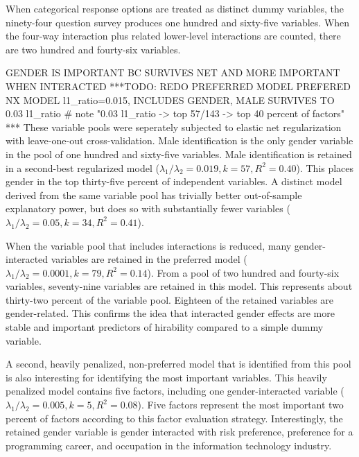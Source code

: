 \documentclass[review]{elsarticle}
\begin{document}
When categorical response options are treated as distinct dummy variables,
the ninety-four question survey produces one hundred and sixty-five variables.
When the four-way interaction plus related lower-level interactions are counted,
there are two hundred and fourty-six variables.

GENDER IS IMPORTANT BC SURVIVES NET AND MORE IMPORTANT WHEN INTERACTED
***TODO: REDO PREFERRED MODEL
PREFERED NX MODEL l1_ratio=0.015, INCLUDES GENDER, MALE SURVIVES TO 0.03 l1_ratio
# note "0.03 l1_ratio -> top 57/143 -> top 40 percent of factors"
***
These variable pools were seperately subjected to elastic net regularization with leave-one-out cross-validation.
Male identification is the only gender variable in the pool of one hundred and sixty-five variables.
Male identification is retained in a second-best regularized model ($ \lambda_1 / \lambda_2 = 0.019, k = 57, R^2=0.40 $).
This places gender in the top thirty-five percent of independent variables.
A distinct model derived from the same variable pool has trivially better out-of-sample explanatory power,
but does so with substantially fewer variables ($ \lambda_1 / \lambda_2 = 0.05, k = 34, R^2=0.41 $).

When the variable pool that includes interactions is reduced, many gender-interacted variables
are retained in the preferred model ($ \lambda_1 / \lambda_2 = 0.0001, k = 79, R^2=0.14 $).
From a pool of two hundred and fourty-six variables, seventy-nine variables are retained in this model.
This represents about thirty-two percent of the variable pool.
Eighteen of the retained variables are gender-related.
This confirms the idea that interacted gender effects are more stable and important predictors of hirability
compared to a simple dummy variable.

A second, heavily penalized, non-preferred model that is identified from this pool is also interesting for identifying the most important variables.
This heavily penalized model contains five factors,
including one gender-interacted variable ($ \lambda_1 / \lambda_2 = 0.005, k = 5, R^2=0.08 $).
Five factors represent the most important two percent of factors according to this factor evaluation strategy.
Interestingly, the retained gender variable is gender interacted with risk preference, preference for a programming career,
and occupation in the information technology industry.
\end{document}

